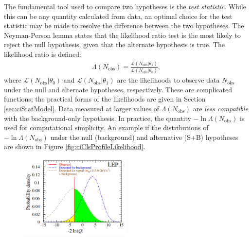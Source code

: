 The fundamental tool used to compare two hypotheses is the \emph{test statistic}.
While this can be any quantity calculated from data, an optimal choice for the test statistic may be made to resolve the difference between the two hypotheses.
The Neyman-Person lemma states that the likelihood ratio test is the most likely to reject the null hypothesis, given that the alternate hypothesis is true.
The likelihood ratio is defined:
\begin{equation}\begin{split}\label{eqn:ciLikelihoodTestStat}
\Lambda(N_\text{obs})=\frac{\mathcal{L}(N_\text{obs}|\theta_1)}{\mathcal{L}(N_\text{obs}|\theta_0)},
\end{split}\end{equation} 
where $\mathcal{L}(N_\text{obs}|\theta_0)$ and $\mathcal{L}(N_\text{obs}|\theta_1)$ are the likelihoods to observe data $N_\text{obs}$ under the null and alternate hypotheses, respectively.
These are complicated functions; the practical forms of the likelihoods are given in Section \ref{sec:ciStatModel}.
Data measured at larger values of $\Lambda(N_\text{obs})$ are \emph{less compatible} with the background-only hypothesis.
In practice, the quantity $-\ln{\Lambda(N_\text{obs})}$ is used for computational simplicity.
An example if the distributions of $-\ln{\Lambda(N_\text{obs})}$ under the null (background) and alternative (S+B) hypotheses are shown in Figure \ref{fig:ciClsProfileLikelihood}.

\begin{figure}[h!]
\captionsetup[subfigure]{position=b}
\centering
\includegraphics[width=0.5\textwidth]{figures/ci/cls.png}
\caption{}
\label{fig:ciCls}
\end{figure}

